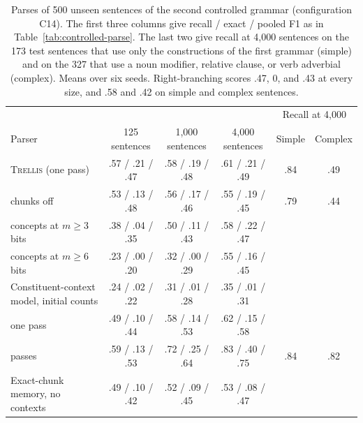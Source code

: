 \documentclass[11pt,letterpaper]{article}
\newcommand{\trellis}{\textsc{Trellis}}
\begin{document}
\begin{table}[!htbp]
\caption{Parses of 500 unseen sentences of the second controlled grammar (configuration C14). The first three columns give recall / exact / pooled F1 as in Table~\ref{tab:controlled-parse}. The last two give recall at 4,000 sentences on the 173 test sentences that use only the constructions of the first grammar (simple) and on the 327 that use a noun modifier, relative clause, or verb adverbial (complex). Means over six seeds. Right-branching scores .47, 0, and .43 at every size, and .58 and .42 on simple and complex sentences.}
\label{tab:controlled-parse2}
\begin{center}
\footnotesize
\setlength{\tabcolsep}{4pt}
\begin{tabular}{lccccc}
\toprule
 & & & & \multicolumn{2}{c}{Recall at 4,000} \\
Parser & 125 sentences & 1,000 sentences & 4,000 sentences & Simple & Complex \\
\midrule
\trellis{} (one pass) & .57 / .21 / .47 & .58 / .19 / .48 & .61 / .21 / .49 & .84 & .49 \\
\quad chunks off & .53 / .13 / .48 & .56 / .17 / .46 & .55 / .19 / .45 & .79 & .44 \\
\quad concepts at $m \geq 3$ bits & .38 / .04 / .35 & .50 / .11 / .43 & .58 / .22 / .47 & & \\
\quad concepts at $m \geq 6$ bits & .23 / .00 / .20 & .32 / .00 / .29 & .55 / .16 / .45 & & \\
Constituent-context model, initial counts & .24 / .02 / .22 & .31 / .01 / .28 & .35 / .01 / .31 & & \\
\quad one pass & .49 / .10 / .44 & .58 / .14 / .53 & .62 / .15 / .58 & & \\
\quad 20 passes & .59 / .13 / .53 & .72 / .25 / .64 & .83 / .40 / .75 & .84 & .82 \\
Exact-chunk memory, no contexts & .49 / .10 / .42 & .52 / .09 / .45 & .53 / .08 / .47 & & \\
\bottomrule
\end{tabular}
\end{center}
\end{table}
\end{document}
